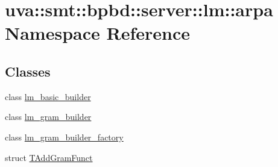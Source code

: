 \hypertarget{namespaceuva_1_1smt_1_1bpbd_1_1server_1_1lm_1_1arpa}{}\section{uva\+:\+:smt\+:\+:bpbd\+:\+:server\+:\+:lm\+:\+:arpa Namespace Reference}
\label{namespaceuva_1_1smt_1_1bpbd_1_1server_1_1lm_1_1arpa}
\subsection*{Classes}
\begin{DoxyCompactItemize}
\item 
class \hyperlink{classuva_1_1smt_1_1bpbd_1_1server_1_1lm_1_1arpa_1_1lm__basic__builder}{lm\+\_\+basic\+\_\+builder}
\item 
class \hyperlink{classuva_1_1smt_1_1bpbd_1_1server_1_1lm_1_1arpa_1_1lm__gram__builder}{lm\+\_\+gram\+\_\+builder}
\item 
class \hyperlink{classuva_1_1smt_1_1bpbd_1_1server_1_1lm_1_1arpa_1_1lm__gram__builder__factory}{lm\+\_\+gram\+\_\+builder\+\_\+factory}
\item 
struct \hyperlink{structuva_1_1smt_1_1bpbd_1_1server_1_1lm_1_1arpa_1_1_t_add_gram_funct}{T\+Add\+Gram\+Funct}
\end{DoxyCompactItemize}
